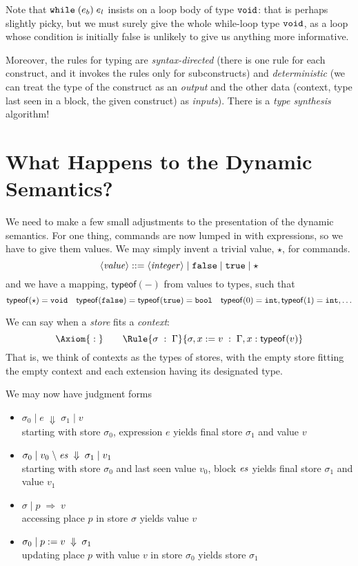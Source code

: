 \documentclass{article}
\begin{document}
Note that $\mathtt{while}\; \mathtt{(}e_b\mathtt{)} \;e_l$ insists on a loop body of type $\mathtt{void}$: that is perhaps slightly picky, but we must surely give the whole while-loop type $\mathtt{void}$, as a loop whose condition is initially false is unlikely to give us anything more
informative.

Moreover, the rules for typing are \emph{syntax-directed} (there is one rule for each construct, and it invokes the rules only for subconstructs) and \emph{deterministic} (we can treat the type of the construct as an \emph{output}
and the other data (context, type last seen in a block, the given construct)
as \emph{inputs}). There is a \emph{type synthesis} algorithm!


\section{What Happens to the Dynamic Semantics?}

\newcommand{\VT}[1]{\mathsf{typeof}(#1)}
\newcommand{\JEv}[4]{#1 \;|\; #2 \;\Downarrow\; #3 \;|\; #4} 
\newcommand{\JEvs}[5]{#1 \;|\; #2 \;\backslash\; #3 \;\Downarrow\; #4 \;|\; #5}
\newcommand{\JPll}[3]{#1 \;|\; #2 \;\Rightarrow\;#3} 
\newcommand{\JPla}[4]{#1 \;|\; #2\ass#3 \;\Downarrow\;#4} 
We need to make a few small adjustments to the presentation of the dynamic semantics. For one thing, commands are now lumped in with expressions, so
we have to give them values. We may simply invent a trivial value, $\star$, for
commands.
\[
  \langle \mathit{value} \rangle ::= \langle \mathit{integer} \rangle \;|\; \mathtt{false} \;|\; \mathtt{true} \;|\; \star
\]
and we have a mapping, $\VT -$ from values to types, such that
\[\VT\star = \void\quad \VT\false=\VT\true=\bool\quad
  \VT 0 = \intg, \VT 1 = \intg,\ldots
\]

We can say when a \emph{store} fits a \emph{context}:
\[
  \Axiom{\;:\;} \qquad
  \Rule{\sigma \;:\;\Gamma}{\sigma,x:=v \;:\; \Gamma,x:\VT v}
\]
That is, we think of contexts as the types of stores, with the empty store fitting the empty context and each extension having its designated type.

We may now have judgment forms
\begin{itemize}
\item $\JEv{\sigma_0}{e}{\sigma_1}{v}$\\
  starting with store $\sigma_0$, expression $e$ yields final store
  $\sigma_1$ and value $v$
\item $\JEvs{\sigma_0}{v_0}\es{\sigma_1}{v_1}$\\
  starting with store $\sigma_0$ and last seen value $v_0$, block
  $\mathit{es}$ yields final store $\sigma_1$ and value $v_1$
\item $\JPll\sigma pv$\\
  accessing place $p$ in store $\sigma$ yields
  value $v$
\item $\JPla{\sigma_0}pv{\sigma_1}$\\
  updating place $p$ with value $v$ in store $\sigma_0$ yields
  store $\sigma_1$
\end{itemize}
\end{document}
